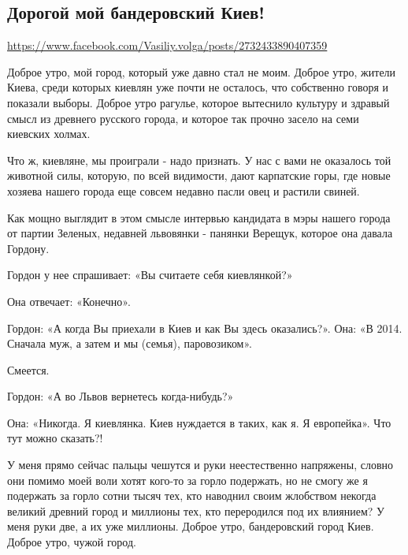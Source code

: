  
 

\subsection{Дорогой мой бандеровский Киев!}

\url{https://www.facebook.com/Vasiliy.volga/posts/2732433890407359}

Доброе утро, мой город, который уже давно стал не моим. Доброе утро, жители
Киева, среди которых киевлян уже почти не осталось, что собственно говоря и
показали выборы. Доброе утро рагулье, которое вытеснило культуру и здравый
смысл из древнего русского города, и которое так прочно засело на семи киевских
холмах. 

Что ж, киевляне, мы проиграли - надо признать. У нас с вами не оказалось той
животной силы, которую, по всей видимости, дают карпатские горы, где новые
хозяева нашего города еще совсем недавно пасли овец и растили свиней. 

Как мощно выглядит в этом смысле интервью кандидата в мэры нашего города от
партии Зеленых, недавней львовянки - панянки Верещук, которое она давала
Гордону. 

Гордон у нее спрашивает: «Вы считаете себя киевлянкой?»

Она отвечает: «Конечно».

Гордон: «А когда Вы приехали в Киев и как Вы здесь оказались?».  Она: «В 2014.
Сначала муж, а затем и мы (семья), паровозиком». 

Смеется. 

Гордон: «А во Львов вернетесь когда-нибудь?»

Она: «Никогда. Я киевлянка. Киев нуждается в таких, как я. Я европейка».  Что
тут можно сказать?! 

У меня прямо сейчас пальцы чешутся и руки неестественно напряжены, словно они
помимо моей воли хотят кого-то за горло подержать, но не смогу же я подержать
за горло сотни тысяч тех, кто наводнил своим жлобством некогда великий древний
город и миллионы тех, кто переродился под их влиянием? У меня руки две, а их
уже миллионы.  Доброе утро, бандеровский город Киев. Доброе утро, чужой город.
